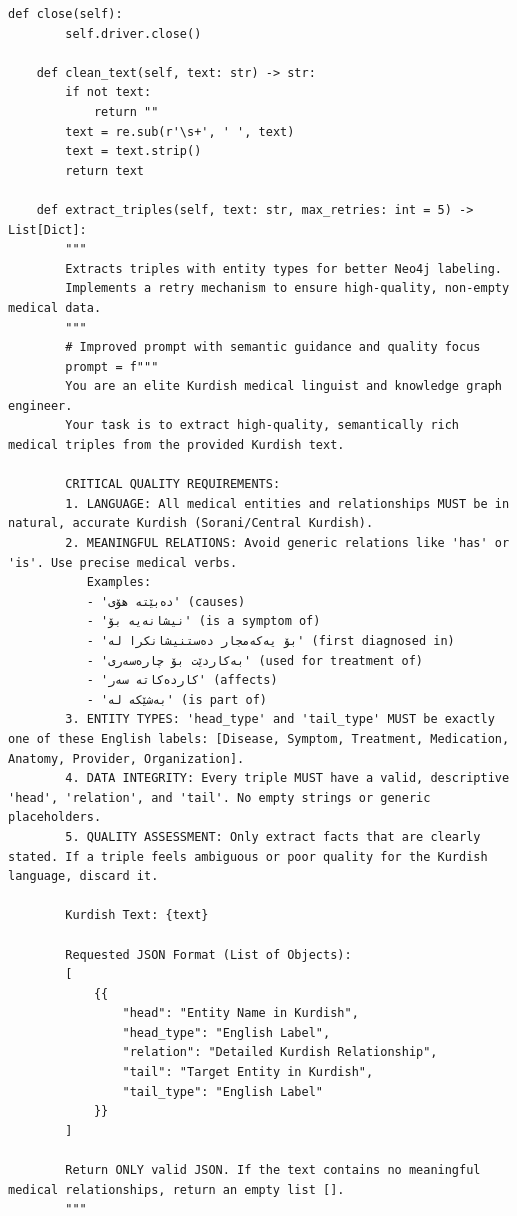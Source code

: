 \documentclass[11pt]{article}
\begin{document}
\begin{lstlisting}[style=pythoncode, caption={kg\_generator.py}]
    def close(self):
        self.driver.close()

    def clean_text(self, text: str) -> str:
        if not text:
            return ""
        text = re.sub(r'\s+', ' ', text)
        text = text.strip()
        return text

    def extract_triples(self, text: str, max_retries: int = 5) -> List[Dict]:
        """
        Extracts triples with entity types for better Neo4j labeling.
        Implements a retry mechanism to ensure high-quality, non-empty medical data.
        """
        # Improved prompt with semantic guidance and quality focus
        prompt = f"""
        You are an elite Kurdish medical linguist and knowledge graph engineer. 
        Your task is to extract high-quality, semantically rich medical triples from the provided Kurdish text.

        CRITICAL QUALITY REQUIREMENTS:
        1. LANGUAGE: All medical entities and relationships MUST be in natural, accurate Kurdish (Sorani/Central Kurdish).
        2. MEANINGFUL RELATIONS: Avoid generic relations like 'has' or 'is'. Use precise medical verbs. 
           Examples: 
           - 'دەبێتە هۆی' (causes)
           - 'نیشانەیە بۆ' (is a symptom of)
           - 'بۆ یەکەمجار دەستنیشانکرا لە' (first diagnosed in)
           - 'بەکاردێت بۆ چارەسەری' (used for treatment of)
           - 'کاردەکاتە سەر' (affects)
           - 'بەشێکە لە' (is part of)
        3. ENTITY TYPES: 'head_type' and 'tail_type' MUST be exactly one of these English labels: [Disease, Symptom, Treatment, Medication, Anatomy, Provider, Organization].
        4. DATA INTEGRITY: Every triple MUST have a valid, descriptive 'head', 'relation', and 'tail'. No empty strings or generic placeholders.
        5. QUALITY ASSESSMENT: Only extract facts that are clearly stated. If a triple feels ambiguous or poor quality for the Kurdish language, discard it.

        Kurdish Text: {text}

        Requested JSON Format (List of Objects):
        [
            {{
                "head": "Entity Name in Kurdish",
                "head_type": "English Label",
                "relation": "Detailed Kurdish Relationship",
                "tail": "Target Entity in Kurdish",
                "tail_type": "English Label"
            }}
        ]

        Return ONLY valid JSON. If the text contains no meaningful medical relationships, return an empty list [].
        """
        

\end{lstlisting}
\end{document}
